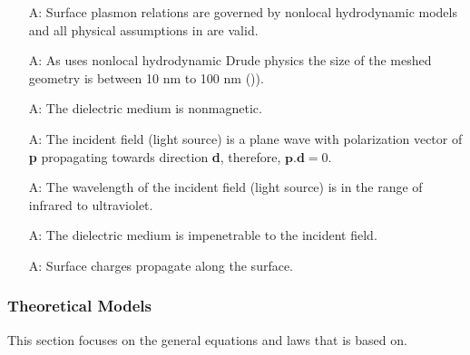 \documentclass[12pt]{article}
\newcounter{assumpnum} %
\begin{document}
	
	\begin{itemize}
		
		\item[A\refstepcounter{assumpnum}\theassumpnum \label{A_nonlocal}:] Surface
		plasmon relations are governed by nonlocal hydrodynamic models and all physical
		assumptions in \cite{hiremath2012numerical} are valid.
		
		\item[A\refstepcounter{assumpnum}\theassumpnum \label{A_size}:] As \progname{}
		uses nonlocal hydrodynamic Drude physics the size of the meshed geometry is
		between 10 nm to 100 nm (\cite{hiremath2012numerical})).
		
		\item[A\refstepcounter{assumpnum}\theassumpnum \label{A_nonmag}:] The dielectric
		medium is nonmagnetic.
		
		\item[A\refstepcounter{assumpnum}\theassumpnum \label{A_pd}:] The incident field
		(light source) is a plane wave with polarization vector of \textbf{p}
		propagating towards direction \textbf{d}, therefore, $\textbf{p}.\textbf{d} =
		0$.
		
		\item[A\refstepcounter{assumpnum}\theassumpnum \label{A_wl}:] The wavelength of
		the incident field (light source) is in the range of infrared to ultraviolet.
		
		\item[A\refstepcounter{assumpnum}\theassumpnum \label{A_impenetrable}:] The
		dielectric medium is impenetrable to the incident field.
		
		\item[A\refstepcounter{assumpnum}\theassumpnum \label{A_leakage}:] Surface
		charges propagate along the surface.

		
		
	\end{itemize}
	
	\subsubsection{Theoretical Models}\label{sec_theoretical}
	
	This section focuses on the general equations and laws that \progname{} is based
	on. %
	
\end{document}
